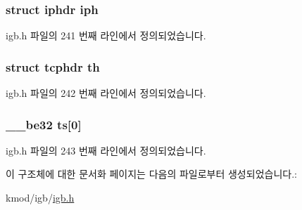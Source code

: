 \subsubsection[{\texorpdfstring{iph}{iph}}]{\setlength{\rightskip}{0pt plus 5cm}struct iphdr iph}\hypertarget{structigb__lrohdr_aa0d3bc23d63a8f27af63f8ed43faceae}{}\label{structigb__lrohdr_aa0d3bc23d63a8f27af63f8ed43faceae}


igb.\+h 파일의 241 번째 라인에서 정의되었습니다.

\subsubsection[{\texorpdfstring{th}{th}}]{\setlength{\rightskip}{0pt plus 5cm}struct tcphdr th}\hypertarget{structigb__lrohdr_a40799b2267bf3b2c39ee098a5c75a7aa}{}\label{structigb__lrohdr_a40799b2267bf3b2c39ee098a5c75a7aa}


igb.\+h 파일의 242 번째 라인에서 정의되었습니다.

\subsubsection[{\texorpdfstring{ts}{ts}}]{\setlength{\rightskip}{0pt plus 5cm}\+\_\+\+\_\+be32 ts\mbox{[}0\mbox{]}}\hypertarget{structigb__lrohdr_a886c506dce37671cf7fd216a7585674c}{}\label{structigb__lrohdr_a886c506dce37671cf7fd216a7585674c}


igb.\+h 파일의 243 번째 라인에서 정의되었습니다.



이 구조체에 대한 문서화 페이지는 다음의 파일로부터 생성되었습니다.\+:\begin{DoxyCompactItemize}
\item 
kmod/igb/\hyperlink{kmod_2igb_2igb_8h}{igb.\+h}\end{DoxyCompactItemize}
